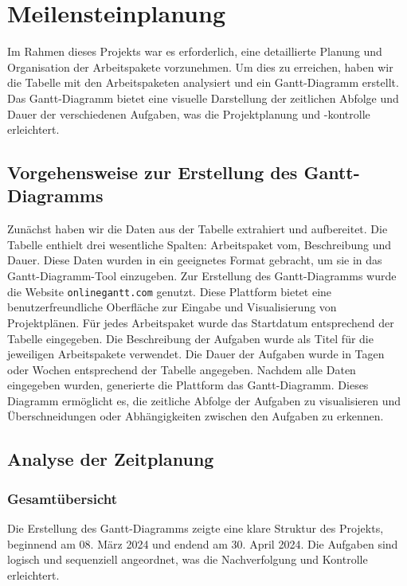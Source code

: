 \chapter{Meilensteinplanung}
Im Rahmen dieses Projekts war es erforderlich, eine detaillierte Planung und Organisation der Arbeitspakete vorzunehmen.
Um dies zu erreichen, haben wir die Tabelle mit den Arbeitspaketen analysiert und ein Gantt-Diagramm erstellt.
Das Gantt-Diagramm bietet eine visuelle Darstellung der zeitlichen Abfolge und Dauer der verschiedenen Aufgaben, was die Projektplanung und -kontrolle erleichtert.

\section*{Vorgehensweise zur Erstellung des Gantt-Diagramms}
Zunächst haben wir die Daten aus der Tabelle extrahiert und aufbereitet.
Die Tabelle enthielt drei wesentliche Spalten: Arbeitspaket vom, Beschreibung und Dauer.
Diese Daten wurden in ein geeignetes Format gebracht, um sie in das Gantt-Diagramm-Tool einzugeben.
Zur Erstellung des Gantt-Diagramms wurde die Website \texttt{onlinegantt.com} genutzt.
Diese Plattform bietet eine benutzerfreundliche Oberfläche zur Eingabe und Visualisierung von Projektplänen. \newline
Für jedes Arbeitspaket wurde das Startdatum entsprechend der Tabelle eingegeben.
Die Beschreibung der Aufgaben wurde als Titel für die jeweiligen Arbeitspakete verwendet.
Die Dauer der Aufgaben wurde in Tagen oder Wochen entsprechend der Tabelle angegeben.
Nachdem alle Daten eingegeben wurden, generierte die Plattform das Gantt-Diagramm. \newline
Dieses Diagramm ermöglicht es, die zeitliche Abfolge der Aufgaben zu visualisieren und Überschneidungen oder Abhängigkeiten zwischen den Aufgaben zu erkennen.

\section*{Analyse der Zeitplanung}
\subsection*{Gesamtübersicht}
Die Erstellung des Gantt-Diagramms zeigte eine klare Struktur des Projekts, beginnend am 08. März 2024 und endend am 30. April 2024.
Die Aufgaben sind logisch und sequenziell angeordnet, was die Nachverfolgung und Kontrolle erleichtert.

